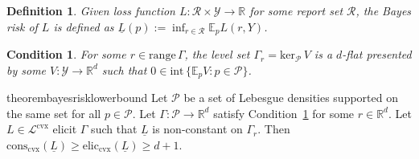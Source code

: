 \documentclass[11pt]{article} %
\newcommand{\Comments}{1}
\newcommand{\mytodo}[2]{\ifnum\Comments=1%
	\todo[linecolor=#1!80!black,backgroundcolor=#1,bordercolor=#1!80!black]{#2}\fi}
\newcommand{\jessiet}[1]{\mytodo{purple!20!white}{JF: #1}}
\newcommand{\btw}[1]{}%
\newcommand{\reals}{\mathbb{R}}
\newcommand{\simplex}{\Delta_\Y}
\newcommand{\interior}{\mathrm{int}\,}
\newcommand{\eliccvx}{\mathrm{elic}_\mathrm{cvx}}
\newcommand{\conscvx}{\mathrm{cons}_\mathrm{cvx}}
\newcommand{\range}{\mathrm{range}\,}
\newcommand{\zeros}[1]{\mathrm{ker}_\P\,#1}
\newcommand{\E}{\mathbb{E}}
\newcommand{\Lcvx}{\mathcal{L}^{\mathrm{cvx}}}
\newcommand{\R}{\mathcal{R}}
\renewcommand{\P}{\mathcal{P}}
\newcommand{\Y}{\mathcal{Y}}
\newcommand{\lbar}{\underline{L}} %
\newcommand{\iden}{\mathrm{iden}}
\newtheorem{definition}{Definition}
\newtheorem{condition}{Condition}
\begin{document}
\begin{definition}
  \label{def:bayes-risk}
  Given loss function $L:\R\times\Y \to \reals$ for some report set $\R$, the \emph{Bayes risk} of $L$ is defined as $\lbar(p) := \inf_{r \in \R} \E_pL(r,Y)$.
\end{definition}




\begin{condition}\label{cond:v-interior}
  For some $r\in\range\Gamma$, the level set $\Gamma_r = \zeros{V}$ is a $d$-flat presented by some $V:\Y\to\reals^d$ such that \btw{I think we only need $\Gamma_r \subseteq \zeros{V}$.  I think I'll update the proof at some point to reflect this, since it actually gets a bit easier to follow.} $0\in\interior\{\E_pV : p\in\P\}$.
\end{condition}


\begin{restatable}{theorem}{bayesrisklowerbound}\label{thm:bayes-risk-lower-bound}
  Let $\P$ be a set of Lebesgue densities supported on the same set for all $p \in \P$.
  Let $\Gamma:\P\to\reals^d$ satisfy Condition~\ref{cond:v-interior} for some $r\in\reals^d$.
  Let $L \in \Lcvx$ elicit $\Gamma$ such that $\lbar$ is non-constant on $\Gamma_r$.
  Then $\conscvx(\lbar) \geq \eliccvx(\lbar) \geq d+1$.
\end{restatable}
\end{document}
